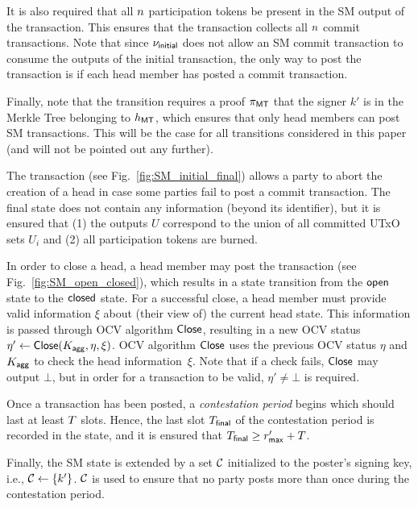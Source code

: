 It is also required that all $n$ participation tokens be present in
the SM output of the \mtxCCom{} transaction.  This ensures that the
\mtxCCom{} transaction collects all $n$ commit transactions.  Note
that since $\nu_\mathsf{initial}$ does not allow an SM commit transaction to
consume the outputs of the initial transaction, the only way to post
the \mtxCCom{} transaction is if each head member has posted a commit
transaction.



Finally, note that the transition requires a proof $\pi_{\mathsf{MT}}$ that the
signer $k'$ is in the Merkle Tree belonging to $h_{\mathsf{MT}}$, which ensures
that only head members can post SM transactions.  This will be the
case for all transitions considered in this paper (and will not be
pointed out any further).


 The \mtxAbort{} transaction
(see Fig.~\ref{fig:SM_initial_final}) allows a party to abort the
creation of a head in case some parties fail to post a commit
transaction.  The final state does not contain any information (beyond
its identifier), but it is ensured that (1) the outputs $U$ correspond
to the union of all committed UTxO sets $U_i$ and (2) all
participation tokens are burned.





 In order to close a head, a head
member may post the \mtxClose{} transaction (see
Fig.~\ref{fig:SM_open_closed}), which results in a state transition
from the $\mathsf{open}$ state to the $\mathsf{closed}$ state.  For a successful
close, a head member must provide valid information $\xi$ about (their
view of) the current head state.  This information is passed through
OCV algorithm $\mathsf{Close}$, resulting in a new OCV status
$\eta' \gets \mathsf{Close}(K_{\mathsf{agg}},\eta,\xi)$.  OCV algorithm $\mathsf{Close}$
uses the previous OCV status $\eta$ and $K_{\mathsf{agg}}$ to check the head
information~$\xi$.  Note that if a check fails, $\mathsf{Close}$ may output
$\bot$, but in order for a \mtxClose{} transaction to be valid,
$\eta' \neq \bot$ is required.

Once a \mtxClose{} transaction has been posted, a \emph{contestation period}
begins which should last at least $T$ slots.  Hence, the last slot
$T_{\mathsf{final}}$ of the contestation period is recorded in the state, and it
is ensured that $T_{\mathsf{final}} \geq r_{\mathsf{max}}' + T$.

Finally, the SM state is extended by a set $\mathcal C$
initialized to the poster's signing key, i.e.,
$\mathcal C \gets \{k'\}$.   $\mathcal C$ is used to ensure that no party
posts more than once during the contestation period.



